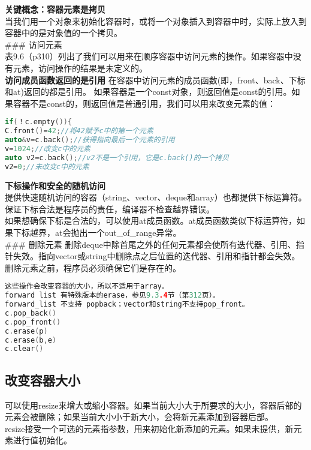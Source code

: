 \documentclass[
  a4paper,
  oneside,tablecaptionabove
]{scrbook}
\begin{document}
\textbf{关键概念：容器元素是拷贝}\\
当我们用一个对象来初始化容器时，或将一个对象插入到容器中时，实际上放入到容器中的是对象值的一个拷贝。\\
\#\#\# 访问元素\\
表9.6（p310）列出了我们可以用来在顺序容器中访问元素的操作。如果容器中没有元素，访问操作的结果是未定义的。\\
\textbf{访问成员函数返回的是引用}
在容器中访问元素的成员函数(即，front、back、下标和at)返回的都是引用。
如果容器是一个const对象，则返回值是const的引用。如果容器不是const的，则返回值是普通引用，我们可以用来改变元素的值：

\begin{lstlisting}[language={C++}]
if(！c.empty()){
C.front()=42;//将42赋予c中的第一个元素
auto&v=c.back();//获得指向最后一个元素的引用
v=1024;//改变c中的元素
auto v2=c.back();//v2不是一个引用，它是c.back()的一个拷贝
v2=0;//未改变c中的元素
\end{lstlisting}

\textbf{下标操作和安全的随机访问}\\
提供快速随机访问的容器（string、vector、deque和array）也都提供下标运算符。保证下标合法是程序员的责任，编译器不检查越界错误。\\
如果想确保下标是合法的，可以使用at成员函数。at成员函数类似下标运算符，如果下标越界，at会抛出一个out\_of\_range异常。\\
\#\#\# 删除元素
删除deque中除首尾之外的任何元素都会使所有迭代器、引用、指针失效。指向vector或string中删除点之后位置的迭代器、引用和指针都会失效。\\
删除元素之前，程序员必须确保它们是存在的。

\begin{lstlisting}[language={C++}]
这些操作会改变容器的大小，所以不适用于array。
forward list 有特殊版本的erase，参见9.3.4节（第312页）。
forward_list 不支持 popback；vector和string不支持pop_front。
c.pop_back()
c.pop_front()
c.erase(p)
c.erase(b,e)
c.clear()
\end{lstlisting}

\subsection{改变容器大小}\label{ux6539ux53d8ux5bb9ux5668ux5927ux5c0f}

可以使用resize来增大或缩小容器。如果当前大小大于所要求的大小，容器后部的元素会被删除；如果当前大小小于新大小，会将新元素添加到容器后部。\\
resize接受一个可选的元素指参数，用来初始化新添加的元素。如果未提供，新元素进行值初始化。
\end{document}
